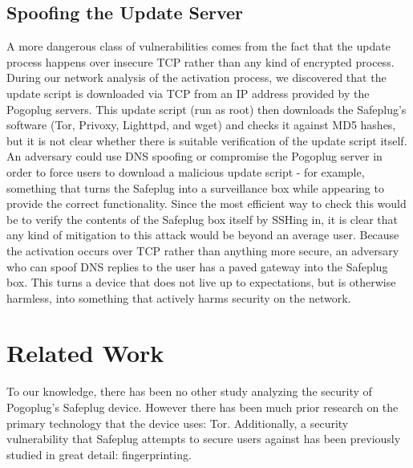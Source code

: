 \documentclass[conference]{IEEEtran}
\begin{document}
\subsection{Spoofing the Update Server}
\label{dnsspoof}
A more dangerous class of vulnerabilities comes from the fact that the update process happens over insecure TCP rather than any kind of encrypted process.  During our network analysis of the activation process, we discovered that the update script is downloaded via TCP from an IP address provided by the Pogoplug servers.  This update script (run as root) then downloads the Safeplug's software (Tor, Privoxy, Lighttpd, and wget) and checks it against MD5 hashes, but it is not clear whether there is suitable verification of the update script itself.  An adversary could use DNS spoofing or compromise the Pogoplug server in order to force users to download a malicious update script - for example, something that turns the Safeplug into a surveillance box while appearing to provide the correct functionality.  Since the most efficient way to check this would be to verify the contents of the Safeplug box itself by SSHing in, it is clear that any kind of mitigation to this attack would be beyond an average user.  Because the activation occurs over TCP rather than anything more secure, an adversary who can spoof DNS replies to the user has a paved gateway into the Safeplug box.  This turns a device that does not live up to expectations, but is otherwise harmless, into something that actively harms security on the network.

\section{Related Work}
To our knowledge, there has been no other study analyzing the security of Pogoplug's Safeplug device.  However there has been much prior research on the primary technology that the device uses: Tor.  Additionally, a security vulnerability that Safeplug attempts to secure users against has been previously studied in great detail: fingerprinting.  
\end{document}
